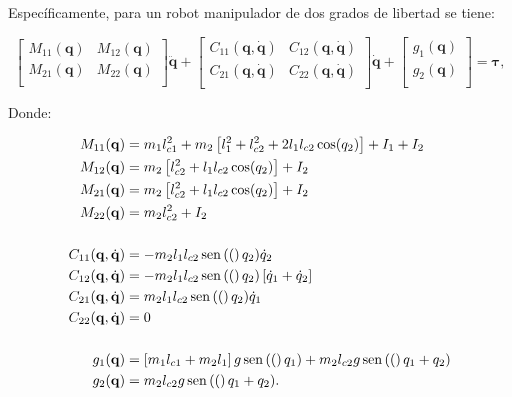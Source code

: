 Específicamente, para un robot manipulador de dos grados de libertad se tiene:

\begin{equation}
	\begin{bmatrix}
		M_{11}(\mathbf{q}) & M_{12}(\mathbf{q})\\
		M_{21}(\mathbf{q}) & M_{22}(\mathbf{q})\\
	\end{bmatrix}\ddot{\mathbf{q}} 
	+
	\begin{bmatrix}
		C_{11}(\mathbf{q}, \dot{\mathbf{q}}) & C_{12}(\mathbf{q}, \dot{\mathbf{q}})\\
		C_{21}(\mathbf{q}, \dot{\mathbf{q}}) & C_{22}(\mathbf{q}, \dot{\mathbf{q}})\\
	\end{bmatrix}\dot{\mathbf{q}}
	+
	\begin{bmatrix}
		g_{1}(\mathbf{q})\\
		g_{2}(\mathbf{q})\\
	\end{bmatrix}
	=
	\mathbf{\tau},
\end{equation}

Donde:

\begin{equation}
	\begin{aligned}
		M_{11}(\mathbf{q}) &= m_{1}l_{c1}^{2} + m_{2}\left[l_{1}^{2} + l_{c2}^{2} + 2l_{1}l_{c2}\cos(q_{2}) \right]  + I_{1} + I_{2}\\
		M_{12}(\mathbf{q}) &= m_{2}\left[l_{c2}^{2} + l_{1}l_{c2}\cos(q_{2})\right] + I_{2}\\
		M_{21}(\mathbf{q}) &= m_{2}\left[l_{c2}^{2} + l_{1}l_{c2}\cos(q_{2})\right] + I_{2}\\
		M_{22}(\mathbf{q}) &= m_{2}l_{c2}^{2} + I_{2}\\
		\\
		C_{11}(\mathbf{q}, \dot{\mathbf{q}}) &= -m_{2}l_{1}l_{c2}\operatorname{sen}\left((\right)q_{2})\dot{q}_{2}\\
		C_{12}(\mathbf{q}, \dot{\mathbf{q}}) &= -m_{2}l_{1}l_{c2}\operatorname{sen}\left((\right)q_{2})\left[\dot{q}_{1} +\dot{q}_{2}\right] \\
		C_{21}(\mathbf{q}, \dot{\mathbf{q}}) &= m_{2}l_{1}l_{c2}\operatorname{sen}\left((\right)q_{2})\dot{q}_{1}\\
		C_{22}(\mathbf{q}, \dot{\mathbf{q}}) &= 0\\
		\\
		g_{1}(\mathbf{q}) &= \left[m_{1}l_{c1} + m_{2}l_{1}\right]g\operatorname{sen}\left((\right)q_{1}) + m_{2}l_{c2}g\operatorname{sen}\left((\right)q_{1}+q_{2}) \\
		g_{2}(\mathbf{q}) &= m_{2}l_{c2}g\operatorname{sen}\left((\right)q_{1}+q_{2}).\\
	\end{aligned}
\end{equation}

